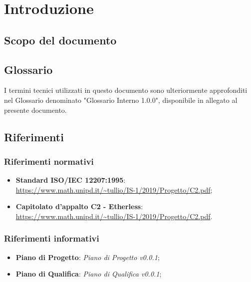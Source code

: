 \section{Introduzione}

\subsection{Scopo del documento}

\subsection{Glossario}
I termini tecnici utilizzati in questo documento sono ulteriormente approfonditi nel Glossario denominato "Glossario Interno 1.0.0", disponibile in allegato al presente documento.

\subsection{Riferimenti}

	\subsubsection{Riferimenti normativi}
	\begin{itemize}
		\item \textbf{Standard ISO/IEC 12207:1995}: \\
		\url{https://www.math.unipd.it/~tullio/IS-1/2019/Progetto/C2.pdf};
		\item \textbf{Capitolato d'appalto C2 - Etherless}: \\
		\url{https://www.math.unipd.it/~tullio/IS-1/2019/Progetto/C2.pdf}.
	\end{itemize}
	
	
	\subsubsection{Riferimenti informativi}
	\begin{itemize}
		\item \textbf{Piano di Progetto}: \textit{Piano di Progetto v0.0.1};
		\item \textbf{Piano di Qualifica}: \textit{Piano di Qualifica v0.0.1};
	\end{itemize}
